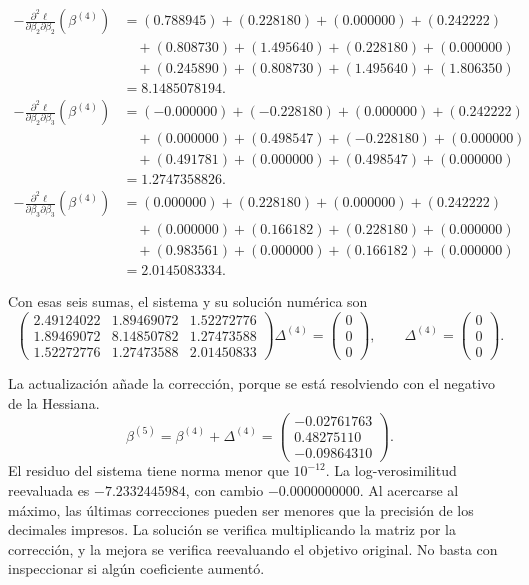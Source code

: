 \documentclass[11pt,a4paper]{article}
\begin{document}
\[
\begin{aligned}
-\frac{\partial^2\ell}{\partial\beta_2\partial\beta_2}(\beta^{(4)})&=(0.788945)+(0.228180)+(0.000000)+(0.242222)\\&\quad+(0.808730)+(1.495640)+(0.228180)+(0.000000)\\&\quad+(0.245890)+(0.808730)+(1.495640)+(1.806350)\\&=8.1485078194.\end{aligned}
\]
\[
\begin{aligned}
-\frac{\partial^2\ell}{\partial\beta_2\partial\beta_3}(\beta^{(4)})&=(-0.000000)+(-0.228180)+(0.000000)+(0.242222)\\&\quad+(0.000000)+(0.498547)+(-0.228180)+(0.000000)\\&\quad+(0.491781)+(0.000000)+(0.498547)+(0.000000)\\&=1.2747358826.\end{aligned}
\]
\[
\begin{aligned}
-\frac{\partial^2\ell}{\partial\beta_3\partial\beta_3}(\beta^{(4)})&=(0.000000)+(0.228180)+(0.000000)+(0.242222)\\&\quad+(0.000000)+(0.166182)+(0.228180)+(0.000000)\\&\quad+(0.983561)+(0.000000)+(0.166182)+(0.000000)\\&=2.0145083334.\end{aligned}
\]

Con esas seis sumas, el sistema y su solución numérica son
\[
\begin{pmatrix}2.49124022&1.89469072&1.52272776\\1.89469072&8.14850782&1.27473588\\1.52272776&1.27473588&2.01450833\end{pmatrix}\Delta^{(4)}=\begin{pmatrix}0\\0\\0\end{pmatrix},\qquad\Delta^{(4)}=\begin{pmatrix}0\\0\\0\end{pmatrix}.
\]

La actualización añade la corrección, porque se está resolviendo
con el negativo de la Hessiana.
\[
\beta^{(5)}=\beta^{(4)}+\Delta^{(4)}=\begin{pmatrix}-0.02761763\\0.48275110\\-0.09864310\end{pmatrix}.
\]
El residuo del sistema tiene norma menor que \(10^{-12}\). La log-verosimilitud reevaluada es \(-7.2332445984\), con cambio \(-0.0000000000\). 
Al acercarse al máximo, las últimas correcciones pueden ser
menores que la precisión de los decimales impresos.
La solución se verifica multiplicando la matriz por la corrección,
y la mejora se verifica reevaluando el objetivo original.
No basta con inspeccionar si algún coeficiente aumentó.
\endgroup
\end{document}

